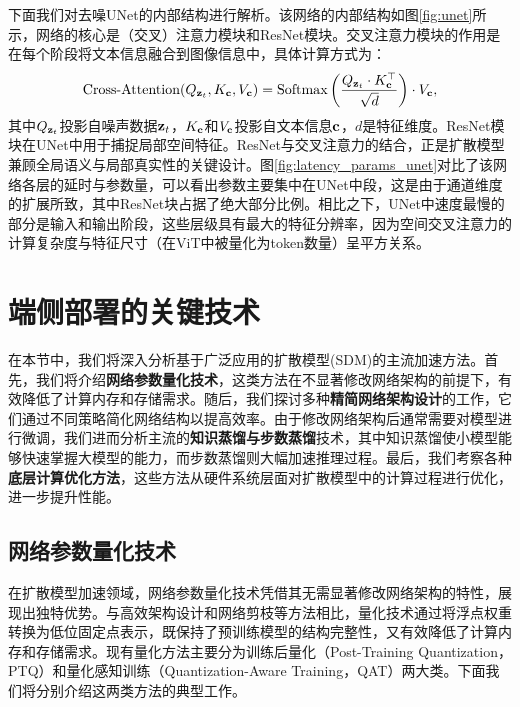 \documentclass[11pt,a4paper,UTF8]{ctexart}
\begin{document}
下面我们对去噪UNet的内部结构进行解析。该网络的内部结构如图\ref{fig:unet}所示，网络的核心是（交叉）注意力模块和ResNet模块。交叉注意力模块的作用是在每个阶段将文本信息融合到图像信息中，具体计算方式为：
\begin{equation*}
    \text{Cross-Attention}(Q_{\mathbf{z}_t},K_{\mathbf{c}},V_{\mathbf{c}})=\text{Softmax}\left(\frac{Q_{\mathbf{z}_t}\cdot K_{\mathbf{c}}^{\top}}{\sqrt{d}}\right)\cdot V_{\mathbf{c}},
\end{equation*}
其中$Q_{\mathbf{z}_t}$投影自噪声数据$\mathbf{z}_t$，$K_{\mathbf{c}}$和$V_{\mathbf{c}}$投影自文本信息$\mathbf{c}$，$d$是特征维度。ResNet模块在UNet中用于捕捉局部空间特征。ResNet与交叉注意力的结合，正是扩散模型兼顾全局语义与局部真实性的关键设计。图\ref{fig:latency_params_unet}对比了该网络各层的延时与参数量，可以看出参数主要集中在UNet中段，这是由于通道维度的扩展所致，其中ResNet块占据了绝大部分比例。相比之下，UNet中速度最慢的部分是输入和输出阶段，这些层级具有最大的特征分辨率，因为空间交叉注意力的计算复杂度与特征尺寸（在ViT中被量化为token数量）呈平方关系。

\newpage

\section{端侧部署的关键技术}

在本节中，我们将深入分析基于广泛应用的扩散模型(SDM)的主流加速方法。首先，我们将介绍\textbf{网络参数量化技术}，这类方法在不显著修改网络架构的前提下，有效降低了计算内存和存储需求。随后，我们探讨多种\textbf{精简网络架构设计}的工作，它们通过不同策略简化网络结构以提高效率。由于修改网络架构后通常需要对模型进行微调，我们进而分析主流的\textbf{知识蒸馏与步数蒸馏}技术，其中知识蒸馏使小模型能够快速掌握大模型的能力，而步数蒸馏则大幅加速推理过程。最后，我们考察各种\textbf{底层计算优化方法}，这些方法从硬件系统层面对扩散模型中的计算过程进行优化，进一步提升性能。

\subsection{网络参数量化技术}

在扩散模型加速领域，网络参数量化技术凭借其无需显著修改网络架构的特性，展现出独特优势。与高效架构设计和网络剪枝等方法相比，量化技术通过将浮点权重转换为低位固定点表示\cite{gholami2022survey,jin2022fnet}，既保持了预训练模型的结构完整性，又有效降低了计算内存和存储需求。现有量化方法主要分为训练后量化（Post-Training Quantization，PTQ）和量化感知训练（Quantization-Aware Training，QAT）两大类。下面我们将分别介绍这两类方法的典型工作。
\end{document}
